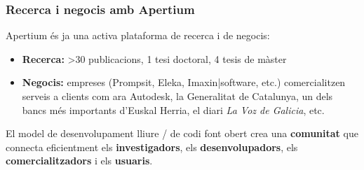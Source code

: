 \documentclass{beamer}
\newcommand{\empha}[1]{\emph{#1}\/}
\begin{document}
\begin{frame}
  \frametitle{Recerca i negocis amb Apertium}
  Apertium és ja una activa plataforma de recerca i de negocis:
  \begin{itemize}
  \item \textbf{Recerca:} >30 publicacions, 1 tesi doctoral, 4 tesis de màster
  \item \textbf{Negocis:} empreses (Prompsit, Eleka, Imaxin|software, etc.) comercialitzen serveis a clients com ara Autodesk, la Generalitat de Catalunya, un dels bancs més importants d'Euskal Herria, el diari \empha{La Voz de Galicia}, etc.
  \end{itemize}
El model de desenvolupament lliure / de codi font obert crea una \textbf{comunitat} que connecta eficientment els \textbf{investigadors}, els \textbf{desenvolupadors}, els \textbf{comercialitzadors} i els \textbf{usuaris}.
\end{frame}
\end{document}

